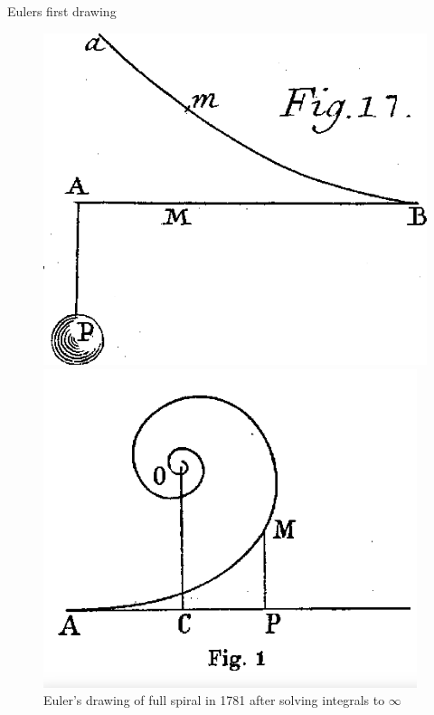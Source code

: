 \documentclass{beamer}
\begin{document}
\begin{frame}{Eulers first drawing}
\begin{figure}
	\centering
	\begin{minipage}{.5\textwidth}
		\centering
		\includegraphics[width=.8\linewidth]{Euler_first_drawing.png}
		\caption{Euler's first drawing from a 1744 publication. P refers to a weight.}
		\label{fig:test1}
	\end{minipage}%
	\begin{minipage}{.5\textwidth}
		\centering
		\includegraphics[width=0.9\linewidth]{Euler second drawing.png}
		\caption{Euler's drawing of full spiral in 1781 after solving integrals to $\infty$}
		\label{fig:test2}
	\end{minipage}
\end{figure}
\end{frame}
\end{document}
